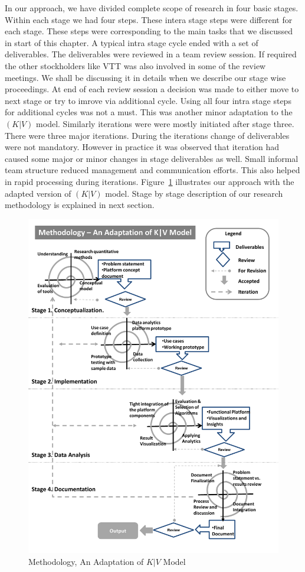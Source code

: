  In our approach, we have divided complete scope of research in four basic stages. Within each stage we had four steps. These intera stage steps were different for each stage. These steps were corresponding to the main tasks that we discussed in start of this chapter. A typical intra stage cycle ended with a set of deliverables. The deliverables were reviewed in a team review session. If required the other stockholders like VTT was also involved in some of the review meetings. We shall be discussing it in details when we describe our stage wise proceedings. At end of each review session a decision was made to either move to next stage or try to imrove via additional cycle. Using all four intra stage steps for additional cycles was not a must. This was another minor adaptation to the \((K|V)\) model. Similarly iterations were were mostly initiated after stage three. There were three major iterations. During the iterations change of deliverables were not mandatory. However in practice it was observed that iteration had caused some major or minor changes in stage deliverables as well. Small informal team structure reduced management and communication efforts. This also helped in rapid processing during iterations. Figure~\ref{fig:kv} illustrates our approach with the adapted version of \((K|V)\) model. Stage by stage description of our research methodology is explained in next section.   
 \begin{figure}[!h]
   \begin{center}
     \includegraphics[width=\textwidth]{images/kv_method.pdf}
     \caption{Methodology, An Adaptation of \(K|V\) Model}
     \label{fig:kv}
   \end{center}
 \end{figure} 
